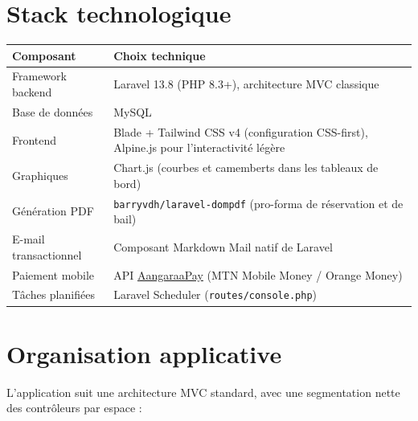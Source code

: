 \documentclass[11pt,a4paper]{report}
\newcommand{\tech}[1]{\texttt{\small #1}}
\begin{document}
\section{Stack technologique}

\begin{longtable}{p{4cm}p{10.3cm}}
\toprule
\textbf{Composant} & \textbf{Choix technique} \\
\midrule
\endhead
Framework backend & Laravel 13.8 (PHP 8.3+), architecture MVC classique \\
Base de données & MySQL \\
Frontend & Blade + Tailwind CSS v4 (configuration CSS-first), Alpine.js pour l'interactivité légère \\
Graphiques & Chart.js (courbes et camemberts dans les tableaux de bord) \\
Génération PDF & \tech{barryvdh/laravel-dompdf} (pro-forma de réservation et de bail) \\
E-mail transactionnel & Composant Markdown Mail natif de Laravel \\
Paiement mobile & API \href{https://aangaraa-pay.com/integrate-aangaraa-pay}{AangaraaPay} (MTN Mobile Money / Orange Money) \\
Tâches planifiées & Laravel Scheduler (\tech{routes/console.php}) \\
\bottomrule
\end{longtable}

\section{Organisation applicative}

L'application suit une architecture MVC standard, avec une segmentation nette des contrôleurs par espace :
\end{document}
